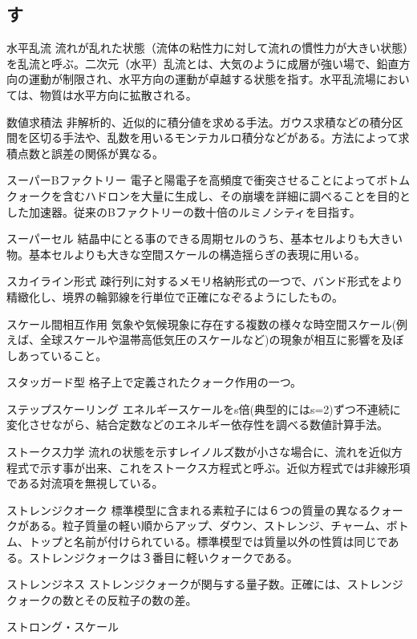 \begin{用語集}
\section{す}
\item{水平乱流}{}
{流れが乱れた状態（流体の粘性力に対して流れの慣性力が大きい状態）を乱流と呼ぶ。二次元（水平）乱流とは、大気のように成層が強い場で、鉛直方向の運動が制限され、水平方向の運動が卓越する状態を指す。水平乱流場においては、物質は水平方向に拡散される。}
\item{数値求積法}{}
{非解析的、近似的に積分値を求める手法。ガウス求積などの積分区間を区切る手法や、乱数を用いるモンテカルロ積分などがある。方法によって求積点数と誤差の関係が異なる。}
\item{スーパーBファクトリー}{}
{電子と陽電子を高頻度で衝突させることによってボトムクォークを含むハドロンを大量に生成し、その崩壊を詳細に調べることを目的とした加速器。従来のBファクトリーの数十倍のルミノシティを目指す。}
\item{スーパーセル}{}
{結晶中にとる事のできる周期セルのうち、基本セルよりも大きい物。基本セルよりも大きな空間スケールの構造揺らぎの表現に用いる。}
\item{スカイライン形式}{}
{疎行列に対するメモリ格納形式の一つで、バンド形式をより精緻化し、境界の輪郭線を行単位で正確になぞるようにしたもの。}
\item{スケール間相互作用}{}
{気象や気候現象に存在する複数の様々な時空間スケール(例えば、全球スケールや温帯高低気圧のスケールなど)の現象が相互に影響を及ぼしあっていること。}
\item{スタッガード型}{}
{格子上で定義されたクォーク作用の一つ。}
\item{ステップスケーリング}{}
{エネルギースケールをs倍(典型的にはs=2)ずつ不連続に変化させながら、結合定数などのエネルギー依存性を調べる数値計算手法。}
\item{ストークス力学}{}
{流れの状態を示すレイノルズ数が小さな場合に、流れを近似方程式で示す事が出来、これをストークス方程式と呼ぶ。近似方程式では非線形項である対流項を無視している。}
\item{ストレンジクオーク}{}
{標準模型に含まれる素粒子には６つの質量の異なるクォークがある。粒子質量の軽い順からアップ、ダウン、ストレンジ、チャーム、ボトム、トップと名前が付けられている。標準模型では質量以外の性質は同じである。ストレンジクォークは３番目に軽いクォークである。}
\item{ストレンジネス}{}
{ストレンジクォークが関与する量子数。正確には、ストレンジクォークの数とその反粒子の数の差。}
\item{ストロング・スケール}{}

\end{用語集}
